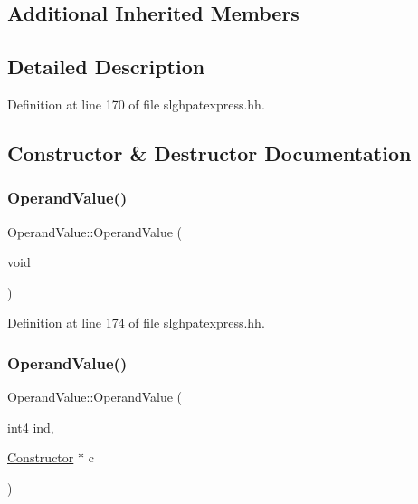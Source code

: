 \subsection*{Additional Inherited Members}


\subsection{Detailed Description}


Definition at line 170 of file slghpatexpress.\+hh.



\subsection{Constructor \& Destructor Documentation}
\mbox{\label{class_operand_value_a962f023ae983e21b6e9363ccd890d700}} 
\subsubsection{\texorpdfstring{OperandValue()}{OperandValue()}\hspace{0.1cm}{\footnotesize\ttfamily [1/2]}}
{\footnotesize\ttfamily Operand\+Value\+::\+Operand\+Value (\begin{DoxyParamCaption}\item[{void}]{ }\end{DoxyParamCaption})\hspace{0.3cm}{\ttfamily [inline]}}



Definition at line 174 of file slghpatexpress.\+hh.

\mbox{\label{class_operand_value_ae835ffc9c50d120bd13dbc4b098f5eaa}} 
\subsubsection{\texorpdfstring{OperandValue()}{OperandValue()}\hspace{0.1cm}{\footnotesize\ttfamily [2/2]}}
{\footnotesize\ttfamily Operand\+Value\+::\+Operand\+Value (\begin{DoxyParamCaption}\item[{int4}]{ind,  }\item[{\mbox{\hyperlink{class_constructor}{Constructor}} $\ast$}]{c }\end{DoxyParamCaption})\hspace{0.3cm}{\ttfamily [inline]}}



